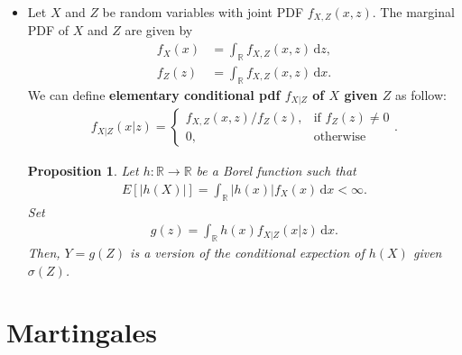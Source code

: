 \documentclass[10pt]{article}
\newtheorem{proposition}[lemma]{Proposition}
\numberwithin{lemma}{section}
\newcommand{\dee}{\mathrm{d}}
\newcommand{\Real}{\mathbb{R}}
\begin{document}
\begin{itemize}
  \item Let $X$ and $Z$ be random variables with joint PDF $f_{X,Z}(x,z)$. The marginal PDF  of $X$ and $Z$ are given by 
  \begin{align*}
    f_X(x) &= \int_{\Real} f_{X,Z}(x,z)\, \dee z, \\
    f_Z(z) &= \int_{\Real} f_{X,Z}(x,z)\, \dee x.
  \end{align*}  
  We can define {\bf elementary conditional pdf $f_{X|Z}$ of $X$ given $Z$} as follow:
  \begin{align*}
    f_{X|Z}(x|z) = \begin{cases}
      f_{X,Z}(x,z) / f_Z(z), & \mbox{if }f_Z(z) \neq 0 \\
      0, & \mbox{otherwise}
    \end{cases}.
  \end{align*}
  \begin{proposition}
    Let $h: \Real \rightarrow \Real$ be a Borel function such that
    \begin{align*}
      E[|h(X)|] = \int_\Real |h(x)|f_X(x)\, \dee x < \infty.
    \end{align*}
    Set
    \begin{align*}
      g(z) = \int_\Real h(x)f_{X|Z}(x|z)\, \dee x.
    \end{align*}
    Then, $Y = g(Z)$ is a version of the conditional expection of $h(X)$ given $\sigma(Z)$.
  \end{proposition}
\end{itemize}

\section{Martingales}
\end{document}

